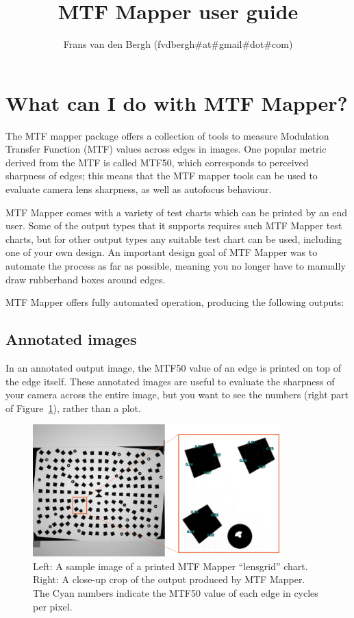 \documentclass[a4paper]{article}
\title{MTF Mapper user guide}
\author{Frans van den Bergh (fvdbergh\#at\#gmail\#dot\#com)}
\begin{document}
\maketitle

\tableofcontents

\newpage

\section{What can I do with MTF Mapper?}
\label{sec:overview}
The MTF mapper package offers a collection of tools to measure Modulation
Transfer Function (MTF) values across edges in images. One popular metric
derived from the MTF is called MTF50, which corresponds to perceived 
sharpness of edges; this means that the MTF mapper tools can be used to 
evaluate camera lens sharpness, as well as autofocus behaviour.

MTF Mapper comes with a variety of test charts which can be printed by an
end user.  Some of the output types that it supports requires such MTF
Mapper test charts, but for other output types any suitable test chart can
be used, including one of your own design.  An important design goal of MTF
Mapper was to automate the process as far as possible, meaning you no longer
have to manually draw rubberband boxes around edges.

MTF Mapper offers fully automated operation, producing the following
outputs:
\subsection{Annotated images}
\label{sec:annotated_images}
In an annotated output image, the MTF50 value of an edge is printed on top
of the edge itself. These annotated images are useful to evaluate the sharpness
of your camera across the entire image, but you want to see the numbers
(right part of Figure~\ref{fig:annotated_example}), rather than a plot.

\begin{figure}[!ht]
\centering
\includegraphics[width=0.85\textwidth]{figures/annotation_example}
\caption{Left: A sample image of a printed MTF Mapper ``lensgrid'' chart.
Right: A close-up crop of the output produced by MTF Mapper. The Cyan
numbers indicate the MTF50 value of each edge in cycles per pixel.}
\label{fig:annotated_example}
\end{figure}
\end{document}
